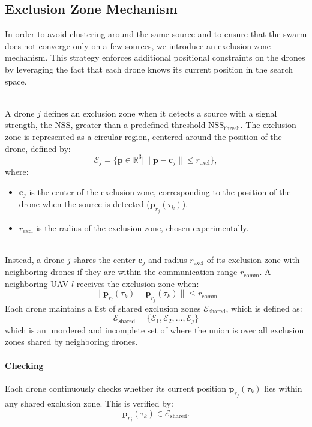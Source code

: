 \subsection{Exclusion Zone Mechanism}
In order to avoid clustering around the same source 
and to ensure that the swarm does not converge only 
on a few sources, we introduce an exclusion zone mechanism. 
This strategy enforces additional positional constraints 
on the drones by leveraging the fact that each drone 
knows its current position in the search space.

\noindent
\\
A drone \( j \) defines an exclusion zone when it detects a source 
with a signal strength, the NSS, greater than a predefined threshold 
\( \text{NSS}_{\text{thresh}} \). The exclusion zone is represented 
as a circular region, centered around the position of the drone, defined by:
\[
\mathcal{E}_j = \{ \mathbf{p} \in \mathbb{R}^3 \mid \|\mathbf{p} - \mathbf{c}_j\| 
\leq r_{\text{excl}} \},
\]
where:
\begin{itemize}
    \item \( \mathbf{c}_j \) is the center of the exclusion zone, 
    corresponding to the position of the drone when the source 
    is detected (\( \mathbf{p}_{r_j}(\tau_k) \)).
    \item \( r_{\text{excl}} \) is the radius of the exclusion zone, 
    chosen experimentally.
\end{itemize}

\noindent
\\
Instead, a drone \( j \) shares the center \( \mathbf{c}_j \) and radius 
\( r_{\text{excl}} \) of its exclusion zone with neighboring drones 
if they are within the communication range \( r_{\text{comm}} \). 
A neighboring UAV \( l \) receives the exclusion zone when:
\begin{equation}
\|\mathbf{p}_{r_l}(\tau_k) - \mathbf{p}_{r_j}(\tau_k)\| \leq r_{\text{comm}}
\label{eq:in_comm}
\end{equation}
Each drone maintains a list of shared exclusion zones 
\( \mathcal{E}_\text{shared} \), which is defined as:
\[
\mathcal{E}_\text{shared} = \{\mathcal{E}_1, \mathcal{E}_2, \dots, \mathcal{E}_j\}
\]
which is an unordered and incomplete set of 
where the union is over all exclusion zones shared by neighboring drones.

\paragraph{Checking}
Each drone continuously checks whether its current position 
\( \mathbf{p}_{r_j}(\tau_k) \) lies within any shared exclusion zone. 
This is verified by:
\[
\mathbf{p}_{r_j}(\tau_k) \in \mathcal{E}_\text{shared}.
\]

